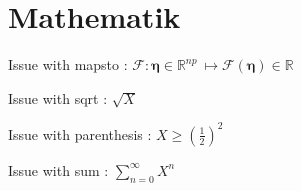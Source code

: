 \chapter{Mathematik}
\bigskip
Issue with mapsto : ${\mathcal F} : \boldsymbol{\eta} \in {\mathbb{R}}^{np}\ \mapsto {\mathcal F}\left(\boldsymbol{\eta} \right)\in \mathbb{R}$

\bigskip
Issue with sqrt : $\sqrt{X}$

\bigskip
Issue with parenthesis : $X \geqslant \left(\frac{1}{2}\right)^2$

\bigskip
Issue with sum : $\sum_{n=0}^\infty X^n$
\newpage